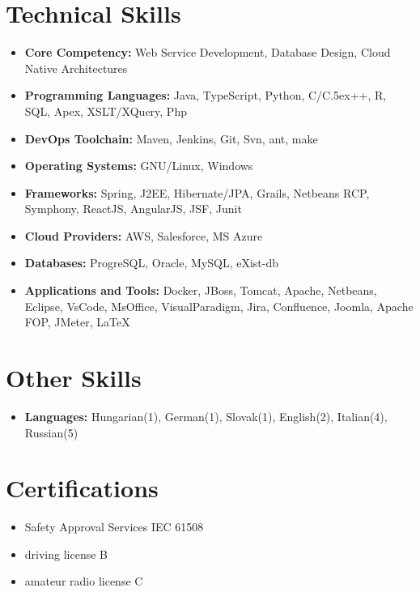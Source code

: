 \documentclass[letterpaper,11pt]{article}
\def\Cplusplus{{\rm C\raise.5ex\hbox{\tiny ++}}}
\begin{document}
\section{\bf Technical Skills}
\begin{itemize}
\item \textbf{Core Competency:} Web Service Development, Database Design, Cloud Native Architectures
\item \textbf{Programming Languages:} Java, TypeScript, Python, C/\Cplusplus, R, SQL, Apex, XSLT/XQuery, Php
\item \textbf{DevOps Toolchain:} Maven, Jenkins, Git, Svn, ant, make
\item \textbf{Operating Systems:} GNU/Linux, Windows
\item \textbf{Frameworks:} Spring, J2EE, Hibernate/JPA, Grails, Netbeans RCP, Symphony, ReactJS, AngularJS, JSF, Junit
\item \textbf{Cloud Providers:} AWS, Salesforce, MS Azure
\item \textbf{Databases:} ProgreSQL, Oracle, MySQL, eXist-db 
\item \textbf{Applications and Tools:} Docker, JBoss, Tomcat, Apache, Netbeans, Eclipse, VsCode, MsOffice, VisualParadigm, Jira, Confluence, Joomla, Apache FOP, JMeter, \LaTeX
\end{itemize}

\section{\bf Other Skills}
\begin{itemize}
\item \textbf{Languages:} Hungarian(1), German(1), Slovak(1), English(2), Italian(4), Russian(5)
\end{itemize}

\section{\bf Certifications}
\begin{itemize}
\item Safety Approval Services IEC 61508
\item driving license B
\item amateur radio license C
\end{itemize}

\end{document}
